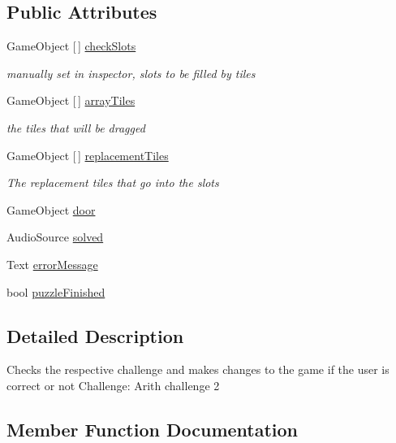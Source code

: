 \subsection*{Public Attributes}
\begin{DoxyCompactItemize}
\item 
Game\+Object \mbox{[}$\,$\mbox{]} \hyperlink{class_arith_completion_check_a29d52d8c29770841ace7a35f5b47f8c7}{check\+Slots}
\begin{DoxyCompactList}\small\item\em manually set in inspector, slots to be filled by tiles \end{DoxyCompactList}\item 
Game\+Object \mbox{[}$\,$\mbox{]} \hyperlink{class_arith_completion_check_a6dd56d93f27bc485fc9354f665a87c2e}{array\+Tiles}
\begin{DoxyCompactList}\small\item\em the tiles that will be dragged \end{DoxyCompactList}\item 
Game\+Object \mbox{[}$\,$\mbox{]} \hyperlink{class_arith_completion_check_a3e4dcde9c1f9660ba26ed864b0a465ac}{replacement\+Tiles}
\begin{DoxyCompactList}\small\item\em The replacement tiles that go into the slots \end{DoxyCompactList}\item 
Game\+Object \hyperlink{class_arith_completion_check_a1ad4ba57922024cef5fc6e788a021f52}{door}
\item 
Audio\+Source \hyperlink{class_arith_completion_check_a3621baade2321e11481457c53e853595}{solved}
\item 
Text \hyperlink{class_arith_completion_check_a715d43af8f5e7b253e9f2da337733d4b}{error\+Message}
\item 
bool \hyperlink{class_arith_completion_check_a11562602e8ce1c9434e869aadf0ac697}{puzzle\+Finished}
\end{DoxyCompactItemize}


\subsection{Detailed Description}
Checks the respective challenge and makes changes to the game if the user is correct or not Challenge\+: Arith challenge 2 

\subsection{Member Function Documentation}
\mbox{\label{class_arith_completion_check_ae813642087af9661c17a03f8545d6f34}} 
